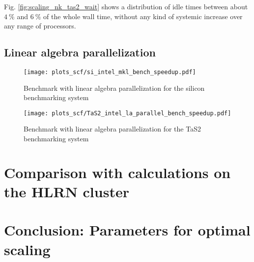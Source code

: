 \documentclass[main.tex]{subfiles}
\begin{document}
Fig. \ref{fig:scaling_nk_tas2_wait} shows a distribution of idle times between about \(\SI{4}{\percent}\) and \(\SI{6}{\percent}\) of the whole wall time, without any kind of systemic increase over any range of processors.

\subsection{Linear algebra parallelization}

\begin{figure}[ht!]
    \centering
    \texttt{[image: plots\_scf/si\_intel\_mkl\_bench\_speedup.pdf]}
    \caption{Benchmark with linear algebra parallelization for the silicon benchmarking system}
    \label{fig:scaling_nd_si}
\end{figure}

\begin{figure}[ht!]
    \centering
    \texttt{[image: plots\_scf/TaS2\_intel\_la\_parallel\_bench\_speedup.pdf]}
    \caption{Benchmark with linear algebra parallelization for the TaS2 benchmarking system}
    \label{fig:scaling_nd_tas2}
\end{figure}


\section{Comparison with calculations on the HLRN cluster}

\section{Conclusion: Parameters for optimal scaling}
\end{document}

